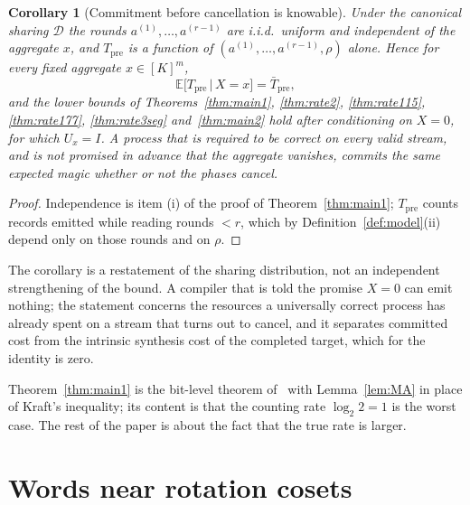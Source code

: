 \documentclass[aps,prx,twocolumn,superscriptaddress,nofootinbib,longbibliography]{revtex4-2}
\theoremstyle{plain}
\newtheorem{corollary}{Corollary}
\theoremstyle{definition}
\theoremstyle{remark}
\newcommand{\Tpre}{T_{\mathrm{pre}}}
\newcommand{\E}{\mathbb{E}}
\begin{document}
\begin{corollary}[Commitment before cancellation is knowable]\label{cor:identity}
Under the canonical sharing $\mathcal D$ the rounds $a^{(1)},\dots,a^{(r-1)}$ are i.i.d.\ uniform and independent of the aggregate $x$, and $\Tpre$ is a function of $(a^{(1)},\dots,a^{(r-1)},\rho)$ alone. Hence for every fixed aggregate $x\in[K]^m$,
\[
\E\big[\Tpre\,\big|\,X=x\big]=\bar\Tpre ,
\]
and the lower bounds of Theorems~\ref{thm:main1}, \ref{thm:rate2}, \ref{thm:rate115}, \ref{thm:rate177}, \ref{thm:rate3seg} and~\ref{thm:main2} hold after conditioning on $X=0$, for which $U_x=I$. A process that is required to be correct on every valid stream, and is not promised in advance that the aggregate vanishes, commits the same expected magic whether or not the phases cancel.
\end{corollary}
\begin{proof}
Independence is item (i) of the proof of Theorem~\ref{thm:main1}; $\Tpre$ counts records emitted while reading rounds $<r$, which by Definition~\ref{def:model}(ii) depend only on those rounds and on $\rho$.
\end{proof}
The corollary is a restatement of the sharing distribution, not an independent strengthening of the bound. A compiler that is told the promise $X=0$ can emit nothing; the statement concerns the resources a universally correct process has already spent on a stream that turns out to cancel, and it separates committed cost from the intrinsic synthesis cost of the completed target, which for the identity is zero.

Theorem~\ref{thm:main1} is the bit-level theorem of~\cite{Paper1} with Lemma~\ref{lem:MA} in place of Kraft's inequality; its content is that the counting rate $\log_2 2=1$ is the worst case. The rest of the paper is about the fact that the true rate is larger.

\section{Words near rotation cosets}\label{sec:tube}
\end{document}
